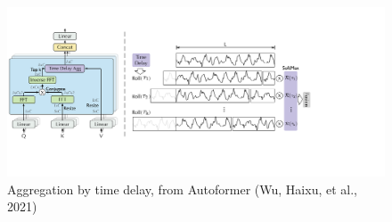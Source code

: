 \begin{figure}[htbp]
    \centering
    \includegraphics[width=12cm]{3_ChapterTranformerVariants/figuras/TimeDelay.pdf}
    \caption{Aggregation by time delay, from Autoformer (Wu, Haixu, et al., 2021)\cite{wu2022autoformerdecompositiontransformersautocorrelation}}
    \end{figure}

